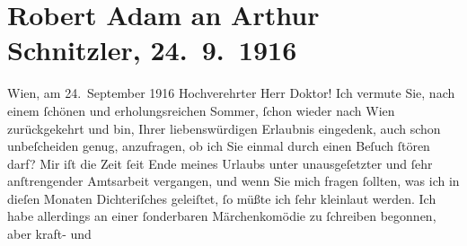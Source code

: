 

         
         \renewcommand{\erwaehntePersonen}{Personen: Robert Adam, Charles de Coster, Alexandre père Dumas,  G. Lenotre, Ricarda Huch, Viktor Franz Patzner}
         \renewcommand{\erwaehnteOrte}{Orte: Wien}
         \renewcommand{\erwaehnteWerke}{Werke: Bleus, Blancs et Rouges, Der große Krieg in Deutschland, Jean Christophe, Le mariage de Monsieur de Bréchard, Meine Memoiren, Märchenkomödie, Tyll Ulenspiegel und Lamm Goedzak}
               \section[Robert Adam an Arthur Schnitzler, 24. 9. 1916]{ Robert Adam an Arthur Schnitzler, 24. 9. 1916}\nopagebreak{}\rehead{ }\begin{ledgroupsized}[t]{13cm}\normalsize\beginnumbering{} \toendnotes[C]{\smallbreak\pagebreak[2]} 
\toendnotes[C]{\smallbreak}\pstart
           \raggedleft{}{\pb}Wien, am 24. September 1916\pend
           \pstart{}Hochverehrter Herr Doktor!\pend\pstart
           Ich vermute Sie, nach einem ſchönen und erholungsreichen Sommer, ſchon wieder nach
                  Wien zurückgekehrt und bin, Ihrer
               liebenswürdigen Erlaubnis eingedenk, auch schon unbeſcheiden genug, anzufragen, ob
               ich Sie einmal durch einen Beſuch ſtören darf?\pend
           \pstart
           Mir iſt die Zeit ſeit Ende meines Urlaubs unter unausgeſetzter und ſehr anſtrengender
               Amtsarbeit vergangen, und wenn Sie mich fragen ſollten, was ich in dieſen Monaten
               Dichteriſches geleiſtet, ſo müßte ich ſehr kleinlaut werden. Ich habe allerdings an
               einer {\pb}ſonderbaren Märchenkomödie zu ſchreiben begonnen, aber kraft- und

\end{ledgroupsized}
